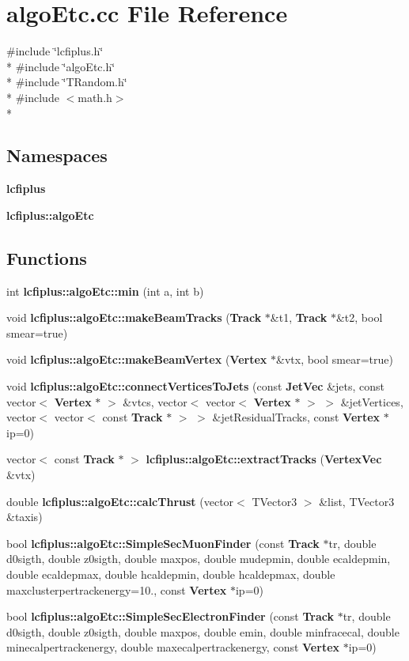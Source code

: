 \section{algo\-Etc.\-cc File Reference}
\label{algoEtc_8cc}
{\ttfamily \#include \char`\"{}lcfiplus.\-h\char`\"{}}\\*
{\ttfamily \#include \char`\"{}algo\-Etc.\-h\char`\"{}}\\*
{\ttfamily \#include \char`\"{}T\-Random.\-h\char`\"{}}\\*
{\ttfamily \#include $<$math.\-h$>$}\\*
\subsection*{Namespaces}
\begin{DoxyCompactItemize}
\item 
{\bf lcfiplus}
\item 
{\bf lcfiplus\-::algo\-Etc}
\end{DoxyCompactItemize}
\subsection*{Functions}
\begin{DoxyCompactItemize}
\item 
int {\bf lcfiplus\-::algo\-Etc\-::min} (int a, int b)
\item 
void {\bf lcfiplus\-::algo\-Etc\-::make\-Beam\-Tracks} ({\bf Track} $\ast$\&t1, {\bf Track} $\ast$\&t2, bool smear=true)
\item 
void {\bf lcfiplus\-::algo\-Etc\-::make\-Beam\-Vertex} ({\bf Vertex} $\ast$\&vtx, bool smear=true)
\item 
void {\bf lcfiplus\-::algo\-Etc\-::connect\-Vertices\-To\-Jets} (const {\bf Jet\-Vec} \&jets, const vector$<$ {\bf Vertex} $\ast$ $>$ \&vtcs, vector$<$ vector$<$ {\bf Vertex} $\ast$ $>$ $>$ \&jet\-Vertices, vector$<$ vector$<$ const {\bf Track} $\ast$ $>$ $>$ \&jet\-Residual\-Tracks, const {\bf Vertex} $\ast$ip=0)
\item 
vector$<$ const {\bf Track} $\ast$ $>$ {\bf lcfiplus\-::algo\-Etc\-::extract\-Tracks} ({\bf Vertex\-Vec} \&vtx)
\item 
double {\bf lcfiplus\-::algo\-Etc\-::calc\-Thrust} (vector$<$ T\-Vector3 $>$ \&list, T\-Vector3 \&taxis)
\item 
bool {\bf lcfiplus\-::algo\-Etc\-::\-Simple\-Sec\-Muon\-Finder} (const {\bf Track} $\ast$tr, double d0sigth, double z0sigth, double maxpos, double mudepmin, double ecaldepmin, double ecaldepmax, double hcaldepmin, double hcaldepmax, double maxclusterpertrackenergy=10., const {\bf Vertex} $\ast$ip=0)
\item 
bool {\bf lcfiplus\-::algo\-Etc\-::\-Simple\-Sec\-Electron\-Finder} (const {\bf Track} $\ast$tr, double d0sigth, double z0sigth, double maxpos, double emin, double minfracecal, double minecalpertrackenergy, double maxecalpertrackenergy, const {\bf Vertex} $\ast$ip=0)
\end{DoxyCompactItemize}
